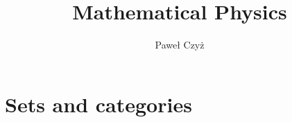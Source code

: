 \documentclass[envcountsame,envcountchap]{svmono}
\begin{document}
\author{Paweł Czyż}
\title{Mathematical Physics}
\maketitle

\frontmatter %

% 
% 

\tableofcontents

\mainmatter %

\part{Sets and categories}



%

\backmatter%

\printindex

\end{document}
